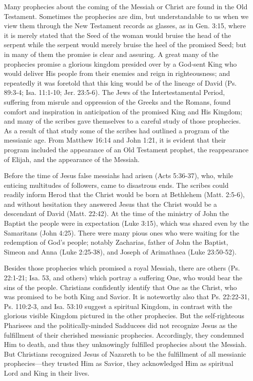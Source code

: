 Many prophecies about the coming of the Messiah or Christ are found in the Old Testament. Sometimes the prophecies are dim, but understandable to us when we view them through the New Testament records as glasses, as in Gen. 3:15, where it is merely stated that the Seed of the woman would bruise the head of the serpent while the serpent would merely bruise the heel of the promised Seed; but in many of them the promise is clear and assuring. A great many of the prophecies promise a glorious kingdom presided over by a God-sent King who would deliver His people from their enemies and reign in righteousness; and repeatedly it was foretold that this king would be of the lineage of David (Ps. 89:3-4; Isa. 11:1-10; Jer. 23:5-6). The Jews of the Intertestamental Period, suffering from misrule and oppression of the Greeks and the Romans, found comfort and inspiration in anticipation of the promised King and His Kingdom; and many of the scribes gave themselves to a careful study of those prophecies. As a result of that study some of the scribes had outlined a program of the messianic age. From Matthew 16:14 and John 1:21, it is evident that their program included the appearance of an Old Testament prophet, the reappearance of Elijah, and the appearance of the Messiah.

Before the time of Jesus false messiahs had arisen (Acts 5:36-37), who, while enticing multitudes of followers, came to disastrous ends. The scribes could readily inform Herod that the Christ would be born at Bethlehem (Matt. 2:5-6), and without hesitation they answered Jesus that the Christ would be a descendant of David (Matt. 22:42). At the time of the ministry of John the Baptist the people were in expectation (Luke 3:15), which was shared even by the Samaritans (John 4:25). There were many pious ones who were waiting for the redemption of God's people; notably Zacharias, father of John the Baptist, Simeon and Anna (Luke 2:25-38), and Joseph of Arimathaea (Luke 23:50-52).

Besides those prophecies which promised a royal Messiah, there are others (Ps. 22:1-21; Isa. 53, and others) which portray a suffering One, who would bear the sins of the people. Christians confidently identify that One as the Christ, who was promised to be both King and Savior. It is noteworthy also that Ps. 22:22-31, Ps. 110:2-3, and Isa. 53:10 suggest a spiritual Kingdom, in contrast with the glorious visible Kingdom pictured in the other prophecies. But the self-righteous Pharisees and the politically-minded Sadducees did not recognize Jesus as the fulfillment of their cherished messianic prophecies. Accordingly, they condemned Him to death, and thus they unknowingly fulfilled prophecies about the Messiah. But Christians recognized Jesus of Nazareth to be the fulfillment of all messianic prophecies---they trusted Him as Savior, they acknowledged Him as spiritual Lord and King in their lives.

